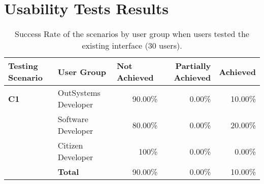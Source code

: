 \chapter{Usability Tests Results}
\label{app:usability_tests_results}

\begin{table}[tb]
    \caption{Success Rate of the scenarios by user group when users tested the existing interface (30 users).}
    \label{tab:effectiveness_existing_interface}
    \begin{tabular}{@{}llrrr@{}}
    \toprule
    \rowcolor[HTML]{EFEFEF} 
    \textbf{Testing Scenario} & \textbf{User Group}  & \multicolumn{1}{l}{\cellcolor[HTML]{EFEFEF}\textbf{Not Achieved}} & \multicolumn{1}{C{2cm}}{\cellcolor[HTML]{EFEFEF}\textbf{Partially Achieved}} & \multicolumn{1}{l}{\cellcolor[HTML]{EFEFEF}\textbf{Achieved}} \\ \midrule
    \textbf{C1}               & OutSystems Developer & 90.00\%                                                           & 0.00\%                                                                  & 10.00\%                                                        \\
                              & Software Developer   & 80.00\%                                                           & 0.00\%                                                                  & 20.00\%                                                       \\
                              & Citizen Developer    & 100\%                                                             & 0.00\%                                                                  & 0.00\%                                                        \\
                              & \textbf{Total}       & 90.00\%                                                           & 0.00\%                                                                  & 10.00\%                                                        \\ \midrule

\end{tabular}
\end{table}
